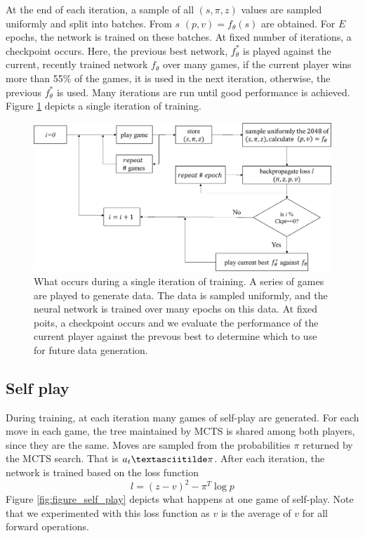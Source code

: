 \documentclass[english]{article}
\begin{document}
At the end of each iteration, a sample of all $(s, \pi, z)$ values are sampled
uniformly and split into batches. From $s$ $(p, v) = f_{\theta}(s)$ are
obtained. For $E$ epochs, the network is trained on these batches. At fixed
number of iterations, a checkpoint occurs. Here, the previous best network,
$f_{\theta}^{\ast}$ is played against the current, recently trained network
$f_{\theta}$ over many games, if the current player wins more than 55\% of the
games, it is used in the next iteration, otherwise, the previous
$f_{\theta}^{\ast}$
is used. Many iterations are run until good performance is achieved. Figure
\ref{fig:figure_training} depicts a single iteration of training.


\begin{figure}[h]
\centering
\includegraphics[scale=0.2]{./images/training}
\caption{What occurs during a single iteration of training. A series of games
    are played to generate data. The data is sampled uniformly, and the neural
    network is trained over many epochs on this data. At fixed poits, a
    checkpoint occurs and we evaluate the performance of the current player
    against the prevous best to determine which to use for future data
    generation.}
\label{fig:figure_training}
\end{figure}

\subsection{Self play}
During training, at each iteration many games of self-play are generated. For
each move in each game, the tree maintained by MCTS is shared among both
players, since they are the same. Moves are sampled from the probabilities $\pi$
returned by the MCTS search. That is $a_t \textasciitilde \pi$. After each iteration, the
network is trained based on the loss function
\begin{equation}
l=(z-v)^2 - \pi^T \log p
    \label{eq:3}
\end{equation}
Figure \ref{fig:figure_self_play} depicts what happens at one game of
self-play.
Note that we experimented with this loss function as $v$ is the average of $v$
for all forward operations.
\end{document}
